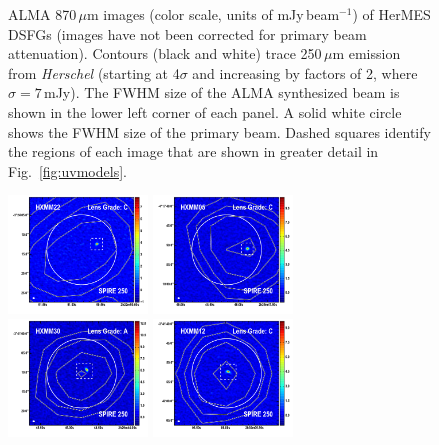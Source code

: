 \documentclass[iop]{emulateapj}
\begin{document}
\begin{figure}[!tbp]
\caption{ ALMA 870$\,\mu$m images (color scale, units of mJy$\,$beam$^{-1}$) of
HerMES DSFGs (images have not been corrected for primary beam attenuation).
Contours (black and white) trace 250$\,\mu$m emission from {\it Herschel}
(starting at 4$\sigma$ and increasing by factors of 2, where $\sigma=7\,$mJy).
The FWHM size of the ALMA synthesized beam is shown in the lower left corner of
each panel.  A solid white circle shows the FWHM size of the primary beam.
Dashed squares identify the regions of each image that are shown in greater
detail in Fig.~\ref{fig:uvmodels}.  \label{fig:imaging}}
\addtocounter{figure}{-1}

\end{figure}

\begin{figure}[!tbp] 
    \begin{centering}
\includegraphics[width=0.331\textwidth]{HXMM22_870_250.pdf}
\includegraphics[width=0.331\textwidth]{HXMM05_870_250.pdf}
\includegraphics[width=0.331\textwidth]{HXMM30_870_250.pdf}
\includegraphics[width=0.331\textwidth]{HXMM12_870_250.pdf}

\end{centering}
\end{figure}
\end{document}
